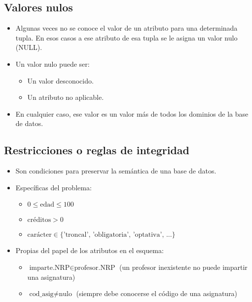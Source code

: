 \subsection*{Valores nulos}
\begin{itemize}
    \item Algunas veces no se conoce el valor de un atributo para una determinada tupla. En esos casos a ese atributo de esa tupla se le asigna un valor nulo (NULL).
    \item Un valor nulo puede ser:
    \begin{itemize}
        \item Un valor desconocido.
        \item Un atributo no aplicable.
    \end{itemize}
    \item En cualquier caso, ese valor es un valor más de todos los dominios de la base de datos.
\end{itemize}

\subsection{Restricciones o reglas de integridad}

\begin{itemize}
    \item Son condiciones para preservar la semántica de una base de datos.
    \item Específicas del problema:
    \begin{itemize}
        \item $0 \leq \text{edad} \leq 100$
        \item $\text{créditos} > 0$
        \item $\text{carácter} \in \{\text{'troncal', 'obligatoria', 'optativa', ...}\}$
    \end{itemize}
    \item Propias del papel de los atributos en el esquema:
    \begin{itemize}
        \item $\text{imparte.NRP} \in \text{profesor.NRP}$ (un profesor inexistente no puede impartir una asignatura)
        \item $\text{cod\_asig} \neq \text{nulo}$ (siempre debe conocerse el código de una asignatura)
    \end{itemize}
\end{itemize}

